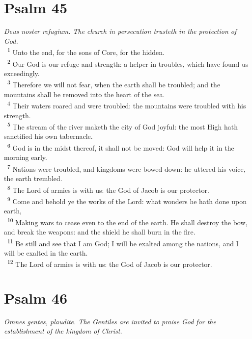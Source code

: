 \documentclass[a5paper,12pt]{article}
\begin{document}
\begin{multicols*}{2}
\section{Psalm 45}
\label{sec:orgd407480}
\emph{Deus noster refugium. The church in persecution trusteth in the protection of God.}\\

~\textsuperscript{1} Unto the end, for the sons of Core, for the hidden.\\
~\textsuperscript{2} Our God is our refuge and strength: a helper in troubles, which have found us exceedingly.\\
~\textsuperscript{3} Therefore we will not fear, when the earth shall be troubled; and the mountains shall be removed into the heart of the sea.\\
~\textsuperscript{4} Their waters roared and were troubled: the mountains were troubled with his strength.\\
~\textsuperscript{5} The stream of the river maketh the city of God joyful: the most High hath sanctified his own tabernacle.\\
~\textsuperscript{6} God is in the midst thereof, it shall not be moved: God will help it in the morning early.\\
~\textsuperscript{7} Nations were troubled, and kingdoms were bowed down: he uttered his voice, the earth trembled.\\
~\textsuperscript{8} The Lord of armies is with us: the God of Jacob is our protector.\\
~\textsuperscript{9} Come and behold ye the works of the Lord: what wonders he hath done upon earth,\\
~\textsuperscript{10} Making wars to cease even to the end of the earth. He shall destroy the bow, and break the weapons: and the shield he shall burn in the fire.\\
~\textsuperscript{11} Be still and see that I am God; I will be exalted among the nations, and I will be exalted in the earth.\\
~\textsuperscript{12} The Lord of armies is with us: the God of Jacob is our protector.\\

\section{Psalm 46}
\label{sec:org0fd718f}
\emph{Omnes gentes, plaudite. The Gentiles are invited to praise God for the establishment of the kingdom of Christ.}\\


\end{multicols*}
\end{document}
